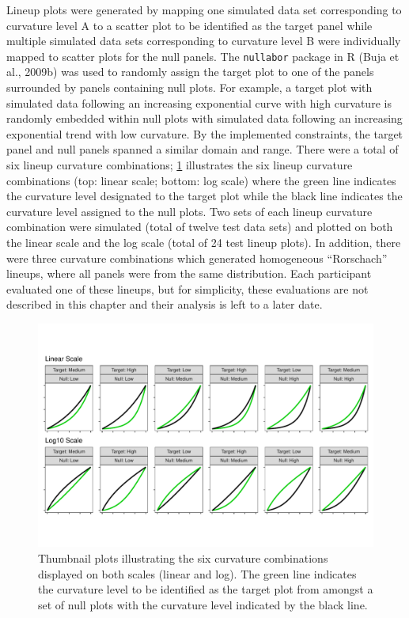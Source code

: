 \documentclass[print]{nuthesis}
\begin{document}
Lineup plots were generated by mapping one simulated data set corresponding to curvature level A to a scatter plot to be identified as the target panel while multiple simulated data sets corresponding to curvature level B were individually mapped to scatter plots for the null panels.
The \texttt{nullabor} package in R (Buja et al., 2009b) was used to randomly assign the target plot to one of the panels surrounded by panels containing null plots.
For example, a target plot with simulated data following an increasing exponential curve with high curvature is randomly embedded within null plots with simulated data following an increasing exponential trend with low curvature.
By the implemented constraints, the target panel and null panels spanned a similar domain and range.
There were a total of six lineup curvature combinations; \cref{fig:curvature-combination-example} illustrates the six lineup curvature combinations (top: linear scale; bottom: log scale) where the green line indicates the curvature level designated to the target plot while the black line indicates the curvature level assigned to the null plots.
Two sets of each lineup curvature combination were simulated (total of twelve test data sets) and plotted on both the linear scale and the log scale (total of 24 test lineup plots).
In addition, there were three curvature combinations which generated homogeneous ``Rorschach'' lineups, where all panels were from the same distribution.
Each participant evaluated one of these lineups, but for simplicity, these evaluations are not described in this chapter and their analysis is left to a later date.

\begin{figure}[tbp]

{\centering \includegraphics[width=1\linewidth,]{thesis_files/figure-latex/curvature-combination-example-1} 

}

\caption[Lineup curvature combinations]{Thumbnail plots illustrating the six curvature combinations displayed on both scales (linear and log). The green line indicates the curvature level to be identified as the target plot from amongst a set of null plots with the curvature level indicated by the black line.}\label{fig:curvature-combination-example}
\end{figure}
\end{document}
